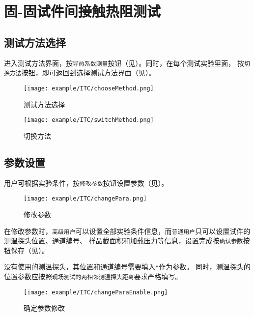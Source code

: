 \section{固-固试件间接触热阻测试}
\subsection{测试方法选择}
进入测试方法界面，按\lstinline{导热系数测量}按钮（见）。同时，在每个测试实验里面，
按\lstinline{切换方法}按钮，即可返回到选择测试方法界面（见）。
\begin{figure}[htbp]
	\centering
	\texttt{[image: example/ITC/chooseMethod.png]}
	\caption{ 测试方法选择 \label{fig:exmp_itc_chooseMethod}}
\end{figure}

\begin{figure}[htbp]
	\centering
	\texttt{[image: example/ITC/switchMethod.png]}
	\caption{ 切换方法 \label{fig:exmp_itc_switchMethod}}
\end{figure}

\subsection{参数设置}
用户可根据实验条件，按\lstinline{修改参数}按钮设置参数（见）。
\begin{figure}[htbp]
	\centering
	\texttt{[image: example/ITC/changePara.png]}
	\caption{ 修改参数 \label{fig:exmp_itc_changePara}}
\end{figure}
在修改参数时，\lstinline{高级用户}可以设置全部实验条件信息，而\lstinline{普通用户}只可以设置试件的测温探头位置、通道编号、
样品截面积和加载压力等信息，设置完成按\lstinline{确认参数}按钮保存（见）。
\begin{note}
没有使用的测温探头，其位置和通道编号需要填入\lstinline{*}作为参数。
同时，测温探头的位置参数应按照\lstinline{现场测试的两相邻测温探头距离}要求严格填写。
\end{note}
\begin{figure}[htbp]
	\centering
	\texttt{[image: example/ITC/changeParaEnable.png]}
	\caption{ 确定参数修改 \label{fig:exmp_itc_changeParaEnable}}
\end{figure}
~\\
